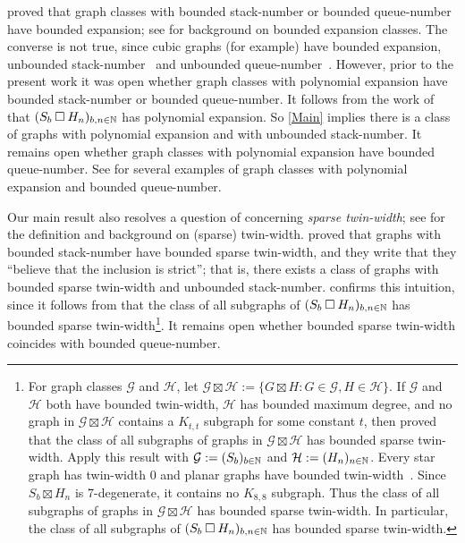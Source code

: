 \documentclass[kpfonts]{patmorin}
\newcommand{\CartProd}{\mathbin{\square}}
\begin{document}
\citet{NOW11} proved that graph classes with bounded stack-number or bounded queue-number have bounded expansion; see \citep{Sparsity} for background on bounded expansion classes. The converse is not true, since cubic graphs (for example) have bounded expansion, unbounded stack-number~\citep{Malitz94a} and unbounded queue-number~\citep{Wood-QueueDegree}. However, prior to the present work it was open whether graph classes with polynomial expansion have bounded stack-number or bounded queue-number. It follows from the work of \citet[Theorem~19]{DHJLW20} that $(S_b \CartProd H_n)_{b,n\in\N}$ has polynomial expansion. So \cref{Main} implies there is a class of graphs with polynomial expansion and with unbounded stack-number. It remains open whether graph classes with polynomial expansion have bounded queue-number. See \citep{DJMMUW20,DMW} for several examples of graph classes with polynomial expansion and bounded queue-number.

Our main result also resolves a question of \citet{BGKTWb} concerning \emph{sparse twin-width}; see \citep{BKTW,BGKTWa,BGKTWb} for the definition and background on (sparse) twin-width. \citet{BGKTWb} proved that graphs with bounded stack-number have bounded sparse twin-width, and they write that they ``believe that the inclusion is strict''; that is, there exists a class of graphs with bounded sparse twin-width and unbounded stack-number.  confirms this intuition, since it follows from \citep[Theorem~10]{BGKTWb} that the class of all subgraphs of $(S_b \CartProd H_n)_{b,n\in\N}$ has bounded sparse twin-width\footnote{For graph classes $\mathcal{G}$ and $\mathcal{H}$, let $\mathcal{G}\boxtimes \mathcal{H} := \{ G\boxtimes H: G \in \mathcal{G}, H\in \mathcal{H}\}$. If $\mathcal{G}$ and $\mathcal{H}$ both have bounded twin-width, $\mathcal{H}$ has bounded maximum degree, and no graph in $\mathcal{G}\boxtimes \mathcal{H}$ contains a $K_{t,t}$ subgraph for some constant $t$, then \citet[Theorem~10]{BGKTWb} proved that the class of all subgraphs of graphs in $\mathcal{G}\boxtimes \mathcal{H}$ has bounded sparse twin-width. Apply this result with $\mathcal{G}:= (S_b)_{b\in \mathbb{N}}$ and $\mathcal{H}:= (H_n)_{n\in\mathbb{N}}$. Every star graph has twin-width $0$ and planar graphs have bounded twin-width~\citep{BKTW}. Since $S_b \boxtimes H_n$ is 7-degenerate, it contains no $K_{8,8}$ subgraph. Thus the class of all subgraphs of graphs in $\mathcal{G} \boxtimes \mathcal{H}$ has bounded sparse twin-width. In particular, the class of all subgraphs of $(S_b \CartProd H_n)_{b,n\in\N}$ has bounded sparse twin-width.}. It remains open whether bounded sparse twin-width coincides with bounded queue-number.
\end{document}
